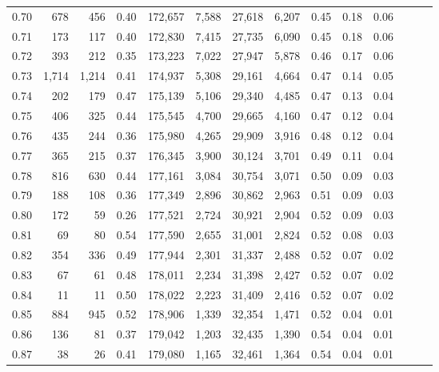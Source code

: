 \begin{tabular}{rrrrrrrrrrrrrr}
0.70 &     678 &    456 &  0.40 &  172,657 &    7,588 &  27,618 &   6,207 &  0.45 &  0.18 &      0.06 \\
0.71 &     173 &    117 &  0.40 &  172,830 &    7,415 &  27,735 &   6,090 &  0.45 &  0.18 &      0.06 \\
0.72 &     393 &    212 &  0.35 &  173,223 &    7,022 &  27,947 &   5,878 &  0.46 &  0.17 &      0.06 \\
0.73 &   1,714 &  1,214 &  0.41 &  174,937 &    5,308 &  29,161 &   4,664 &  0.47 &  0.14 &      0.05 \\
0.74 &     202 &    179 &  0.47 &  175,139 &    5,106 &  29,340 &   4,485 &  0.47 &  0.13 &      0.04 \\
0.75 &     406 &    325 &  0.44 &  175,545 &    4,700 &  29,665 &   4,160 &  0.47 &  0.12 &      0.04 \\
0.76 &     435 &    244 &  0.36 &  175,980 &    4,265 &  29,909 &   3,916 &  0.48 &  0.12 &      0.04 \\
0.77 &     365 &    215 &  0.37 &  176,345 &    3,900 &  30,124 &   3,701 &  0.49 &  0.11 &      0.04 \\
0.78 &     816 &    630 &  0.44 &  177,161 &    3,084 &  30,754 &   3,071 &  0.50 &  0.09 &      0.03 \\
0.79 &     188 &    108 &  0.36 &  177,349 &    2,896 &  30,862 &   2,963 &  0.51 &  0.09 &      0.03 \\
0.80 &     172 &     59 &  0.26 &  177,521 &    2,724 &  30,921 &   2,904 &  0.52 &  0.09 &      0.03 \\
0.81 &      69 &     80 &  0.54 &  177,590 &    2,655 &  31,001 &   2,824 &  0.52 &  0.08 &      0.03 \\
0.82 &     354 &    336 &  0.49 &  177,944 &    2,301 &  31,337 &   2,488 &  0.52 &  0.07 &      0.02 \\
0.83 &      67 &     61 &  0.48 &  178,011 &    2,234 &  31,398 &   2,427 &  0.52 &  0.07 &      0.02 \\
0.84 &      11 &     11 &  0.50 &  178,022 &    2,223 &  31,409 &   2,416 &  0.52 &  0.07 &      0.02 \\
0.85 &     884 &    945 &  0.52 &  178,906 &    1,339 &  32,354 &   1,471 &  0.52 &  0.04 &      0.01 \\
0.86 &     136 &     81 &  0.37 &  179,042 &    1,203 &  32,435 &   1,390 &  0.54 &  0.04 &      0.01 \\
0.87 &      38 &     26 &  0.41 &  179,080 &    1,165 &  32,461 &   1,364 &  0.54 &  0.04 &      0.01 \\

\end{tabular}
